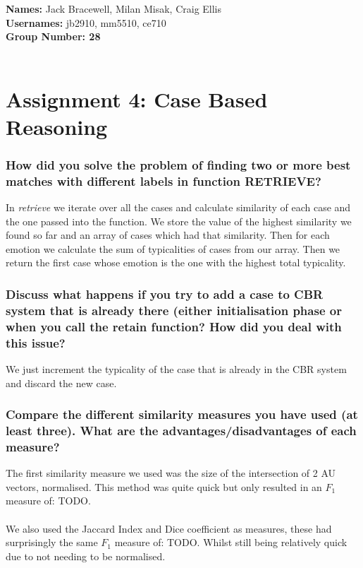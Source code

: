 \documentclass[12pt]{article}
\begin{document}
{\bf Names:} Jack Bracewell, Milan Misak, Craig Ellis \\
{\bf Usernames:} jb2910, mm5510, ce710 \\
{\bf Group Number: 28}  \\ \\

\section*{Assignment 4: Case Based Reasoning}

\subsubsection*{How did you solve the problem of finding two or more best matches with different labels in function RETRIEVE?}

In \emph{retrieve} we iterate over all the cases and calculate similarity of each case and the one passed into the function. We store the value of the highest similarity we found so far and an array of cases which had that similarity. Then for each emotion we calculate the sum of typicalities of cases from our array. Then we return the first case whose emotion is the one with the highest total typicality.


\subsubsection*{Discuss what happens if you try to add a case to CBR system that is already there (either initialisation phase or when you call the retain function? How did you deal with this issue?}

We just increment the typicality of the case that is already in the CBR system and discard the new case. 

\subsubsection*{Compare the different similarity measures you have used (at least three). What are the advantages/disadvantages of each measure?}

The first similarity measure we used was the size of the intersection of 2 AU vectors, normalised. This method was quite quick but only resulted in an $F_1$ measure of: TODO. \\ \\

We also used the Jaccard Index and Dice coefficient as measures, these had surprisingly the same $F_1$ measure of: TODO. Whilst still being relatively quick due to not needing to be normalised.\\\\
\end{document}
